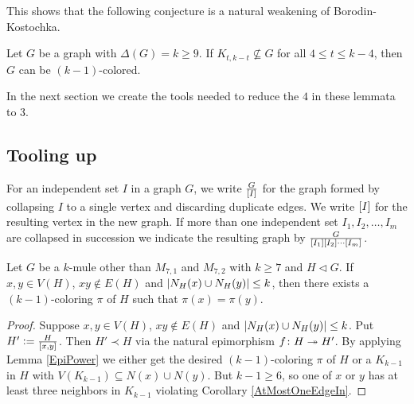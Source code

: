 This shows that the following conjecture is a natural weakening of Borodin-Kostochka.

\begin{conjecture}\label{NonInducedFourDeal}
Let $G$ be a graph with $\Delta(G) = k \geq 9$. If $K_{t, k - t} \not \subseteq G$ for all $4 \leq t \leq k - 4$, then $G$ can be $(k - 1)$-colored.
\end{conjecture}

In the next section we create the tools needed to reduce the $4$ in these lemmata to $3$.

\subsection{Tooling up}
For an independent set $I$ in a graph $G$, we write $\frac{G}{\left[ I \right]}$ for
the graph formed by collapsing $I$ to a single vertex and discarding duplicate
edges.  We write $\left[ I \right]$ for the resulting vertex in the new graph.  If
more than one independent set $I_1, I_2, \ldots, I_m$ are collapsed in
succession we indicate the resulting graph by
$\frac{G}{\left[ I_1 \right]\left[ I_2 \right]\cdots\left[ I_m \right]}$.

\begin{lem}\label{ToolOne}
Let $G$ be a $k$-mule other than $M_{7,1}$ and $M_{7,2}$ with $k \geq 7$ and $H
\lhd G$. If $x, y \in V(H)$, $xy \not \in E(H)$ and  $\left|N_H(x) \cup N_H(y)\right| \leq k$, then there exists a $(k - 1)$-coloring $\pi$ of $H$ such that $\pi(x) = \pi(y)$.
\end{lem}
\begin{proof}
Suppose $x, y \in V(H)$, $xy \not \in E(H)$ and $\left|N_H(x) \cup N_H(y)\right| \leq
k$.  Put $H' \mathrel{\mathop:}= \frac{H}{\left[ x, y \right]}$. Then
$H' \prec H$ via the natural epimorphism $f\colon H \twoheadrightarrow H'$.  By applying
Lemma \ref{EpiPower} we either get the desired $(k - 1)$-coloring $\pi$ of
$H$ or a $K_{k-1}$ in $H$ with $V(K_{k-1}) \subseteq N(x) \cup N(y)$.  But $k -
1 \geq 6$, so one of $x$ or $y$ has at least three neighbors in $K_{k-1}$
violating Corollary \ref{AtMostOneEdgeIn}.
\end{proof}

